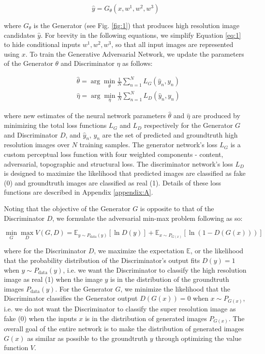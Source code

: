 \documentclass[tc, manuscript]{copernicus}
\begin{document}
\begin{equation}\label{eq:1}
  \hat{y} = G_\theta(x, w^1, w^2, w^3)
\end{equation}

where $G_\theta$ is the Generator (see Fig. \ref{fig:1}) that produces high resolution image candidates $\hat{y}$.
For brevity in the following equations, we simplify Equation \eqref{eq:1} to hide conditional inputs $w^1, w^2, w^3$, so that all input images are represented using $x$.
To train the Generative Adversarial Network, we update the parameters of the Generator $\theta$ and Discriminator $\eta$ as follows:

\begin{align}
  & \hat{\theta} = \arg\min_{\theta} \frac{1}{N}\sum_{n=1}^{N}L_G(\hat{y}_n, y_n) \label{eq:2}\\
  & \hat{\eta} = \arg\min_{\eta} \frac{1}{N}\sum_{n=1}^{N}L_D(\hat{y}_n, y_n) \label{eq:3}
\end{align}

where new estimates of the neural network parameters $\hat{\theta}$ and $\hat{\eta}$ are produced by minimizing the total loss functions $L_G$ and $L_D$ respectively for the Generator $G$ and Discriminator $D$, and $\hat{y}_n$, $y_n$ are the set of predicted and groundtruth high resolution images over $N$ training samples.
The generator network's loss $L_G$ is a custom perceptual loss function with four weighted components - content, adversarial, topographic and structural loss.
The discriminator network's loss $L_D$ is designed to maximize the likelihood that predicted images are classified as fake (0) and groundtruth images are classified as real (1).
Details of these loss functions are described in Appendix \ref{appendix:A}.

Noting that the objective of the Generator $G$ is opposite to that of the Discriminator $D$, we formulate the adversarial min-max problem following \citet{GoodfellowGenerativeAdversarialNetworks2014} as so:

\begin{equation}\label{eq:4}
  \min_{G} \max_{D} V(G,D) = \mathbb{E}_{y \sim P_{\text{data}}(y)}[\ln D(y)] + \mathbb{E}_{x \sim P_{G(x)}}[\ln(1-D(G(x)))]
\end{equation}

where for the Discriminator $D$, we maximize the expectation $\mathbb{E}$, or the likelihood that the probability distribution of the Discriminator's output fits $D(y)=1$ when $y \sim P_{\text{data}}(y)$, i.e. we want the Discriminator to classify the high resolution image as real (1) when the image $y$ is in the distribution of the groundtruth images $P_{\text{data}}(y)$.
For the Generator $G$, we minimize the likelihood that the Discriminator classifies the Generator output $D(G(x))=0$ when $x \sim P_{G(x)}$, i.e. we do not want the Discriminator to classify the super resolution image as fake (0) when the inputs $x$ is in the distribution of generated images $P_{G(x)}$.
The overall goal of the entire network is to make the distribution of generated images $G(x)$ as similar as possible to the groundtruth $y$ through optimizing the value function $V$.
\end{document}
